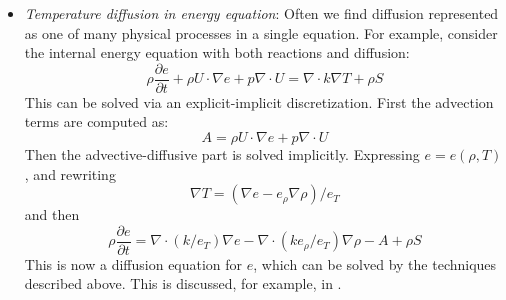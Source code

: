\begin{itemize}
\item {\em Temperature diffusion in energy equation}: Often we find
 diffusion represented as one of many physical processes in a single
 equation.  For example, consider the internal energy equation with
 both reactions and diffusion:
 \begin{equation}
 \rho\frac{\partial e}{\partial t} + \rho U \cdot \nabla e + p \nabla \cdot U = \nabla \cdot k \nabla T + \rho S
 \end{equation}
 This can be solved via an explicit-implicit discretization.  First
 the advection terms are computed as:
 \begin{equation}
 A = \rho U \cdot \nabla e + p \nabla \cdot U
 \end{equation}
 Then the advective-diffusive part is solved implicitly.  Expressing
 $e = e(\rho, T)$, and rewriting
 \begin{equation}
 \nabla T = (\nabla e - e_\rho \nabla \rho)/e_T
 \end{equation}
  and then
 \begin{equation}
 \rho \frac{\partial e}{\partial t} = \nabla \cdot (k/e_T) \nabla e - \nabla \cdot (k e_\rho/e_T) \nabla \rho -A + \rho S
 \end{equation}
 This is now a diffusion equation for $e$, which can be solved by the
 techniques described above.  This is discussed, for example, in
 \cite{SNpaper,malone:2011}.
\end{itemize}

